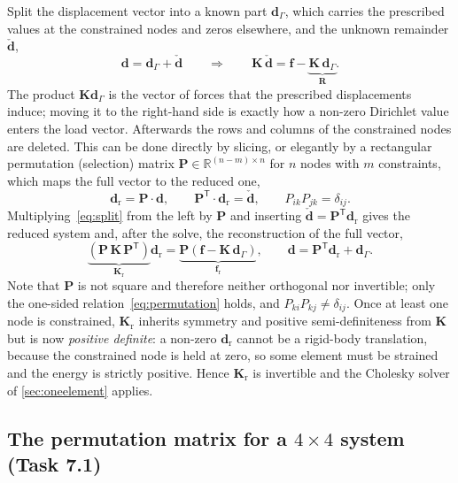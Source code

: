 \documentclass[11pt,a4paper]{article}
\numberwithin{equation}{section}
\theoremstyle{remark}
\newcommand{\R}{\mathbb{R}}
\newcommand{\bK}{\bm{K}}
\newcommand{\bP}{\bm{P}}
\newcommand{\bR}{\bm{R}}
\newcommand{\bd}{\bm{d}}
\newcommand{\bff}{\bm{f}}
\begin{document}
Split the displacement vector into a known part $\bd_{\Gamma}$, which carries the
prescribed values at the constrained nodes and zeros elsewhere, and the unknown remainder
$\check{\bd}$,
\begin{equation}\label{eq:split}
  \bd = \bd_{\Gamma} + \check{\bd}
  \qquad\Longrightarrow\qquad
  \bK\,\check{\bd} = \bff - \underbrace{\bK\,\bd_{\Gamma}}_{\bR} .
\end{equation}
The product $\bK\bd_{\Gamma}$ is the vector of forces that the prescribed displacements
induce; moving it to the right-hand side is exactly how a non-zero Dirichlet value enters
the load vector. Afterwards the rows and columns of the constrained nodes are deleted. This
can be done directly by slicing, or elegantly by a rectangular permutation (selection)
matrix $\bP \in \R^{(n-m)\times n}$ for $n$ nodes with $m$ constraints, which maps the full
vector to the reduced one,
\begin{equation}\label{eq:permutation}
  \bd_{\mathrm{r}} = \bP\cdot\bd,
  \qquad
  \bP^{\mathsf{T}}\cdot\bd_{\mathrm{r}} = \check{\bd},
  \qquad
  P_{ik}P_{jk} = \delta_{ij}.
\end{equation}
Multiplying~\eqref{eq:split} from the left by $\bP$ and inserting
$\check{\bd} = \bP^{\mathsf{T}}\bd_{\mathrm{r}}$ gives the reduced system and, after the
solve, the reconstruction of the full vector,
\begin{equation}\label{eq:reducedsystem}
  \underbrace{\left(\bP\,\bK\,\bP^{\mathsf{T}}\right)}_{\bK_{\mathrm{r}}}\bd_{\mathrm{r}}
  = \underbrace{\bP\left(\bff - \bK\,\bd_{\Gamma}\right)}_{\bff_{\mathrm{r}}},
  \qquad
  \bd = \bP^{\mathsf{T}}\bd_{\mathrm{r}} + \bd_{\Gamma}.
\end{equation}
Note that $\bP$ is not square and therefore neither orthogonal nor invertible; only the
one-sided relation~\eqref{eq:permutation} holds, and $P_{ki}P_{kj} \ne \delta_{ij}$. Once
at least one node is constrained, $\bK_{\mathrm{r}}$ inherits symmetry and positive
semi-definiteness from $\bK$ but is now \emph{positive definite}: a non-zero
$\bd_{\mathrm{r}}$ cannot be a rigid-body translation, because the constrained node is held
at zero, so some element must be strained and the energy is strictly positive. Hence
$\bK_{\mathrm{r}}$ is invertible and the Cholesky solver of \cref{sec:oneelement} applies.

\subsection{The permutation matrix for a $4\times4$ system (Task 7.1)}\label{sec:permutation}
\end{document}
